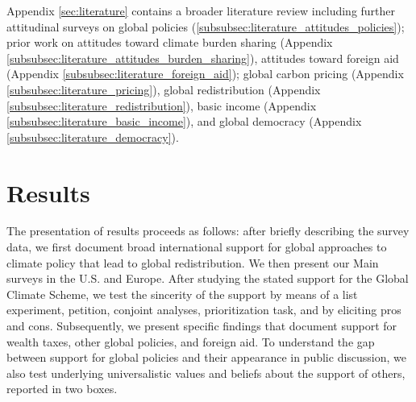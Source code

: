 Appendix \ref{sec:literature} contains a broader literature review including further attitudinal surveys on global policies (\ref{subsubsec:literature_attitudes_policies}); prior work on attitudes toward climate burden sharing (Appendix \ref{subsubsec:literature_attitudes_burden_sharing}), attitudes toward foreign aid (Appendix \ref{subsubsec:literature_foreign_aid}); global carbon pricing (Appendix \ref{subsubsec:literature_pricing}), global redistribution (Appendix \ref{subsubsec:literature_redistribution}), basic income (Appendix \ref{subsubsec:literature_basic_income}), and global democracy (Appendix \ref{subsubsec:literature_democracy}).



\section{Results}
The presentation of results proceeds as follows: after briefly describing the survey data, %
we first document broad international support for global approaches to climate policy that lead to global redistribution. %
We then present our Main surveys in the U.S. and Europe. After studying the stated support for the Global Climate Scheme, we test the sincerity of the support by means of a list experiment, petition, conjoint analyses, prioritization task, and by eliciting pros and cons. %
Subsequently, we present specific findings that document support for wealth taxes, other global policies, and foreign aid. %
To understand the gap between support for global policies and their appearance in public discussion, we also test underlying universalistic values 
and beliefs about the support of others, reported in two boxes. %



